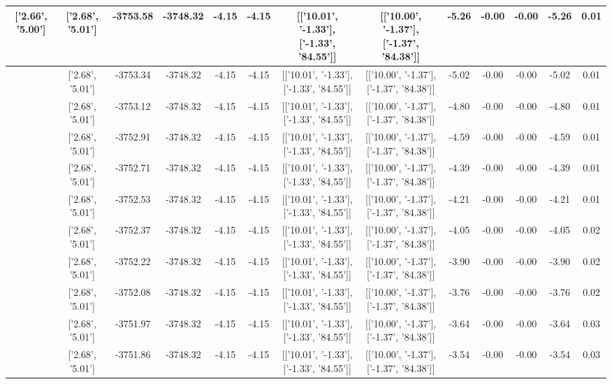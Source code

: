 \begin{table}[htbp]
\begin{adjustbox}{angle=90}
\begin{tabular}{|c|c|c|c|c|c|c|c|c|c|c|c|c|}
 ['2.66', '5.00'] & ['2.68', '5.01'] & -3753.58 & -3748.32 & -4.15 & -4.15 & [['10.01', '-1.33'], ['-1.33', '84.55']] & [['10.00', '-1.37'], ['-1.37', '84.38']] & -5.26 & -0.00 & -0.00 & -5.26 & 0.01\\ \hline
 ['2.66', '5.00'] & ['2.68', '5.01'] & -3753.34 & -3748.32 & -4.15 & -4.15 & [['10.01', '-1.33'], ['-1.33', '84.55']] & [['10.00', '-1.37'], ['-1.37', '84.38']] & -5.02 & -0.00 & -0.00 & -5.02 & 0.01\\ \hline
 ['2.67', '5.00'] & ['2.68', '5.01'] & -3753.12 & -3748.32 & -4.15 & -4.15 & [['10.01', '-1.33'], ['-1.33', '84.55']] & [['10.00', '-1.37'], ['-1.37', '84.38']] & -4.80 & -0.00 & -0.00 & -4.80 & 0.01\\ \hline
 ['2.67', '5.00'] & ['2.68', '5.01'] & -3752.91 & -3748.32 & -4.15 & -4.15 & [['10.01', '-1.33'], ['-1.33', '84.55']] & [['10.00', '-1.37'], ['-1.37', '84.38']] & -4.59 & -0.00 & -0.00 & -4.59 & 0.01\\ \hline
 ['2.67', '5.00'] & ['2.68', '5.01'] & -3752.71 & -3748.32 & -4.15 & -4.15 & [['10.01', '-1.33'], ['-1.33', '84.55']] & [['10.00', '-1.37'], ['-1.37', '84.38']] & -4.39 & -0.00 & -0.00 & -4.39 & 0.01\\ \hline
 ['2.67', '5.00'] & ['2.68', '5.01'] & -3752.53 & -3748.32 & -4.15 & -4.15 & [['10.01', '-1.33'], ['-1.33', '84.55']] & [['10.00', '-1.37'], ['-1.37', '84.38']] & -4.21 & -0.00 & -0.00 & -4.21 & 0.01\\ \hline
 ['2.67', '5.00'] & ['2.68', '5.01'] & -3752.37 & -3748.32 & -4.15 & -4.15 & [['10.01', '-1.33'], ['-1.33', '84.55']] & [['10.00', '-1.37'], ['-1.37', '84.38']] & -4.05 & -0.00 & -0.00 & -4.05 & 0.02\\ \hline
 ['2.67', '5.00'] & ['2.68', '5.01'] & -3752.22 & -3748.32 & -4.15 & -4.15 & [['10.01', '-1.33'], ['-1.33', '84.55']] & [['10.00', '-1.37'], ['-1.37', '84.38']] & -3.90 & -0.00 & -0.00 & -3.90 & 0.02\\ \hline
 ['2.67', '5.00'] & ['2.68', '5.01'] & -3752.08 & -3748.32 & -4.15 & -4.15 & [['10.01', '-1.33'], ['-1.33', '84.55']] & [['10.00', '-1.37'], ['-1.37', '84.38']] & -3.76 & -0.00 & -0.00 & -3.76 & 0.02\\ \hline
 ['2.67', '5.00'] & ['2.68', '5.01'] & -3751.97 & -3748.32 & -4.15 & -4.15 & [['10.01', '-1.33'], ['-1.33', '84.55']] & [['10.00', '-1.37'], ['-1.37', '84.38']] & -3.64 & -0.00 & -0.00 & -3.64 & 0.03\\ \hline
 ['2.68', '5.00'] & ['2.68', '5.01'] & -3751.86 & -3748.32 & -4.15 & -4.15 & [['10.01', '-1.33'], ['-1.33', '84.55']] & [['10.00', '-1.37'], ['-1.37', '84.38']] & -3.54 & -0.00 & -0.00 & -3.54 & 0.03\\ \hline

\end{tabular}
\end{adjustbox}
\end{table}
